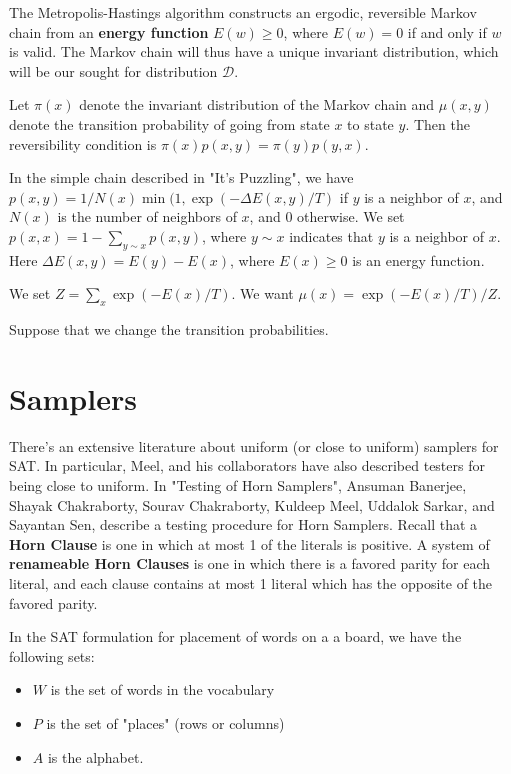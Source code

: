 \documentclass[11pt]{article}
\begin{document}
The Metropolis-Hastings algorithm constructs an ergodic, reversible
Markov chain from an \textbf{energy function} \(E(w) \ge 0\), where \(E(w) = 0\)
if and only if \(w\) is valid.  The Markov chain will thus have a unique
invariant distribution, which will be our sought for distribution
\(\mathcal{D}\).

Let \(\pi(x)\) denote the invariant distribution of the Markov chain and
\(\mu(x,y)\) denote the transition probability of going from state \(x\)
to state \(y\).  Then the reversibility condition is
\(\pi(x)p(x,y) = \pi(y) p(y,x)\).

In the simple chain described in "It's Puzzling", we have
\(p(x,y) = 1/N(x) \min(1, \exp( - \Delta E(x,y)/ T)\) if \(y\) is a
neighbor of \(x\), and \(N(x)\) is the number of neighbors of \(x\), and 0
otherwise.   We set \(p(x,x) = 1 - \sum_{y \sim x} p(x,y)\), where \(y
\sim x\) indicates that \(y\) is a neighbor of \(x\).  Here \(\Delta E(x,y)
= E(y) - E(x)\), where \(E(x) \ge 0\) is an energy function.

We set \(Z = \sum_x \exp(-E(x) / T)\).  We want \(\mu(x) = \exp(-E(x)/T)
/ Z\).  

Suppose that we change the transition probabilities.
\section{Samplers}
\label{sec:orgdebecee}
There's an extensive literature about uniform (or close to uniform)
samplers for SAT.  In particular, Meel, and his collaborators have
also described testers for being close to uniform.  In "Testing of
Horn Samplers", Ansuman Banerjee, Shayak Chakraborty, Sourav
Chakraborty, Kuldeep Meel, Uddalok Sarkar, and Sayantan Sen, describe
a testing procedure for Horn Samplers.  Recall that a \textbf{Horn Clause} is
one in which at most 1 of the literals is positive.  A system of \textbf{renameable
Horn Clauses} is  one in which there is a favored parity for each
literal, and each clause contains at most 1 literal which has the
opposite of the favored parity.

In the SAT formulation for placement of words on a a board, we have
the following sets:
\begin{itemize}
\item \(W\) is the set of words in the vocabulary
\item \(P\) is the set of "places" (rows or columns)
\item \(A\) is the alphabet.
\end{itemize}
\end{document}
